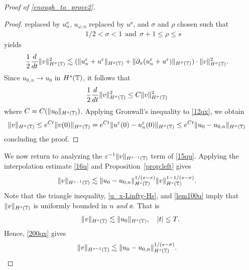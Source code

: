 \begin{proof}[Proof of \eqref{enough_to_prove2}]
\begin{proof}
replaced by $u^\ee_n$, $u_{\omega,n}$ replaced by $u^\ee$, and $\sigma$ and 
$\rho$ chosen such that
%
%
\begin{equation}
\label{size_of_sigma'}
\begin{split}
	& 1/2 < \sigma < 1 \ \ \text{and} \ \  \sigma + 1 \le \rho \le s
\end{split}
\end{equation}
%
%
yields
%
%
\begin{equation*}
\begin{split}
\frac{1}{2}\frac{d}{dt} \|v\|_{H^\sigma(\mathbb{T})}^2
& \lesssim
(\|u^{\varepsilon}_n + u^\varepsilon \|_{H^{\rho}(\mathbb{T})} +
\|\partial_x(u^{\varepsilon}_n + u^\varepsilon) \|_{H^\sigma(\mathbb{T})})
\cdot \|v\|_{H^\sigma(\mathbb{T})}^2.
\end{split}
\end{equation*}
%
%
Since $u_{0,n} \to u_{0}$ in $H^s(\mathbb{T})$, it follows that 
%
\begin{equation}
\begin{split}
\label{12qx}
\frac{1}{2}\frac{d}{dt} \|v\|_{H^{\sigma}(\mathbb{T})}^2
& \le
C \|v\|_{H^{\sigma}(\mathbb{T})}^2
\end{split}
\end{equation}
%
%
where $C = C(\|u_0\|_{H^s(\mathbb{T})})$. 
Applying Gronwall's inequality to \eqref{12qx}, we obtain
%
%
\begin{equation*}
\begin{split}
\|v\|_{H^{\sigma}(\mathbb{T})}
& \le e^{C t}\|v(0)\|_{H^{\sigma}(\mathbb{T})}
= e^{C t}\|u^\varepsilon(0) - u^\varepsilon_n(0) \|_{H^{\sigma}(\mathbb{T})} \le e^{C t} \|u_0 - 
u_{0,n}\|_{H^\sigma(\mathbb{T})}
\end{split}
\end{equation*}
%
%
concluding the proof. 
\end{proof}
%
%
%

We now return to analyzing the $\varepsilon^{-1}
\|v\|_{H^{s-1}(\mathbb{T})}$ term of \eqref{15qu}.
Applying the 
interpolation estimate \eqref{16u} and
Proposition~\ref{prop:left} gives
%
%
%
%
\begin{equation}
\begin{split}
\label{200qx}
\|v\|_{H^{s-1}(\mathbb{T})} 
& \lesssim  
\|u_0-u_{0,n}\|_{H^s(\mathbb{T})}^{1/(s-\sigma)}\|v\|_{H^s(\mathbb{T})}^{1- 
1/(s-\sigma)}.
\end{split}
\end{equation}
%
%
%
Note that the triangle inequality, \eqref{u_x-Linfty-Hs},
and \eqref{lem100u} 
imply that $\|v\|_{H^s(\mathbb{T})}$ is uniformly bounded in $n$ \emph{and} $\ee$. 
That is
%
%
\begin{equation*}
\begin{split}
	\|v\|_{H^s(\mathbb{T})} \lesssim \|u_0 \|_{H^s(\mathbb{T})}, \quad |t| \le T.
\label{growth_v}
\end{split}
\end{equation*}
%
%
Hence, \eqref{200qx} gives
%
%
\begin{equation}
\begin{split}
\label{200qxr}
\|v\|_{H^{s-1}(\mathbb{T})} 
& \lesssim  
\|u_0-u_{0,n}\|_{H^s(\mathbb{T})}^{1/(s-\sigma)}.
\end{split}
\end{equation}


\end{proof}
